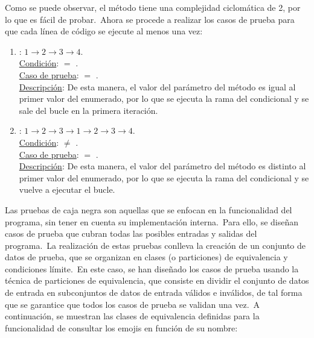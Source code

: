 Como se puede observar, el método tiene una complejidad ciclomática de 2, por lo que es fácil de probar.\ Ahora se
procede a realizar los casos de prueba para que cada línea de código se ejecute al menos una vez:

\begin{enumerate}
	\item {}: $1 \rightarrow 2 \rightarrow 3 \rightarrow 4$.
	\\
	\underline{Condición}:  $=$ .\\
	\underline{Caso de prueba}:  $=$ .\\
	\underline{Descripción}:
	De esta manera, el valor del parámetro del método es igual al primer valor del enumerado,
	por lo que se ejecuta la rama  del condicional y se sale del bucle en la primera iteración.

	\item {}: $1 \rightarrow 2 \rightarrow 3 \rightarrow 1 \rightarrow 2 \rightarrow 3 \rightarrow 4$.
	\\
	\underline{Condición}:  $\neq$ .\\
	\underline{Caso de prueba}:  $=$ .\\
	\underline{Descripción}:
	De esta manera, el valor del parámetro del método es distinto al primer valor del
	enumerado, por lo que se ejecuta la rama  del condicional y se vuelve a ejecutar el bucle.
\end{enumerate}
\label{itm:casos-prueba-pruebas-unitarias-caja-blanca}


Las pruebas de caja negra son aquellas que se enfocan en la funcionalidad del programa, sin tener en cuenta su
implementación interna.\ Para ello, se diseñan casos de prueba que cubran todas las posibles entradas y salidas
del programa.\ La realización de estas pruebas conlleva la creación de un conjunto de datos de prueba, que se
organizan en clases (o particiones) de equivalencia y condiciones límite.\ En este caso, se han diseñado los casos de
prueba usando la técnica de particiones de equivalencia, que consiste en dividir el conjunto de datos de entrada en
subconjuntos de datos de entrada válidos e inválidos, de tal forma que se garantice que todos los casos de prueba
se validan una vez.\ A continuación, se muestran las clases de equivalencia definidas para la funcionalidad de
consultar los emojis en función de su nombre:

